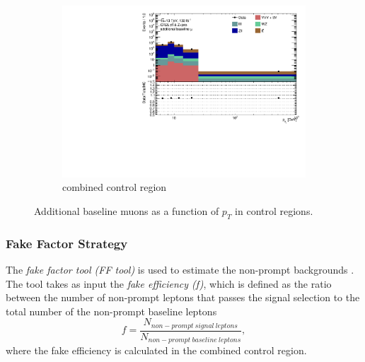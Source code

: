 \begin{figure}[!htbp]
\begin{subfigure}{.49\textwidth}
    \end{subfigure} \\
    \begin{subfigure}{.49\textwidth}
        \centering
        \includegraphics[width=.9\linewidth]{figures/Analysis/Background/Overlay_pt_Baseline_muons_Combined.pdf}
        \caption{combined control region \label{fig:Add_mu_combined}}
    \end{subfigure}
        \caption{ Additional baseline muons as a function of $p_{T}$ in control regions. \label{fig:ControlRegionsAdditionalBaselineMuonpT}}
\end{figure}

\newpage
\subsubsection{ Fake Factor Strategy }
\label{subsubsec:EstimationStrategy}

The \textit{fake factor tool (FF tool)} is used to estimate the non-prompt backgrounds \cite{FakeBkgTool}. The tool takes as input the \textit{fake efficiency (f)}, which is defined as the ratio between the number of non-prompt leptons that passes the signal selection to the total number of the non-prompt baseline leptons
\begin{equation}
f = \frac{N_{non-prompt~signal~leptons}}{N_{non-prompt~baseline~leptons}},
\end{equation}
where the fake efficiency is calculated in the combined control region.

